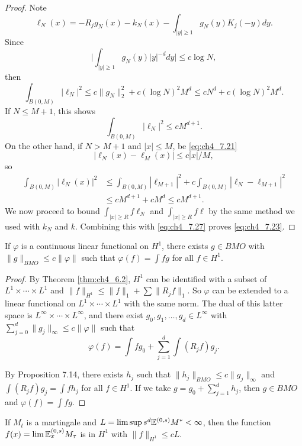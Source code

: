 \begin{proof}
Note
\[
    \ell_N(x) = -R_jg_N(x) - k_N(x) - \int_{|y|\geq 1} g_N(y)K_j(-y)dy.
\]
Since
\[
    \Big|\int_{|y|\geq 1} g_N(y)|y|^{-d}dy\Big| \leq c\log N,
\]
then
\[
    \int_{B(0,M)} |\ell_N|^2 \leq c\|g_N\|_2^2 + c(\log N)^2M^d \leq cN^d + c(\log N)^2M^d.
\]
If $N\le M+1$, this shows
\[
    \int_{B(0,M)}|\ell_N|^2\leq cM^{d+1}.
\]
On the other hand, if $N>M+1$ and $|x|\le M$, be \eqref{eq:ch4_7.21}
\[
    |\ell_N(x)-\ell_M(x)|\le c|x|/M,
\]
so
\begin{align*}
    \int_{B(0,M)}|\ell_N(x)|^2 &\leq \int_{B(0,M)}|\ell_{M+1}|^2 + c\int_{B(0,M)}|\ell_N-\ell_{M+1}|^2 \\
    &\leq cM^{d+1}+cM^d\le cM^{d+1}.
\end{align*}
We now proceed to bound $\int_{|x|\geq R} f\ell_N$ and $\int_{|x|\geq R} f\ell$ by the same method we used with $k_N$ and $k$. Combining this with \eqref{eq:ch4_7.27} proves \eqref{eq:ch4_7.23}.
\end{proof}

\begin{proposition}\label{prop:ch4_7.15}
If $\varphi$ is a continuous linear functional on $H^1$, there exists $g \in BMO$ with $\|g\|_{BMO} \leq c\|\varphi\|$ such that $\varphi(f) = \int fg$ for all $f \in H^1$.
\end{proposition}


\begin{proof}
By Theorem \ref{thm:ch4_6.2}, $H^1$ can be identified with a subset of $L^1 \times \cdots \times L^1$ and $\|f\|_{H^1} \leq \|f\|_1 + \sum \|R_jf\|_1$. So $\varphi$ can be extended to a linear functional on $L^1 \times \cdots \times L^1$ with the same norm. The dual of this latter space is $L^\infty \times \cdots \times L^\infty$, and there exist $g_0,g_1,\ldots,g_d \in L^\infty$ with $\sum_{j=0}^d \|g_j\|_\infty \leq c\|\varphi\|$ such that
\[
    \varphi(f) = \int fg_0 + \sum_{j=1}^d \int (R_jf)g_j.
\]

By Proposition 7.14, there exists $h_j$ such that $\|h_j\|_{BMO} \leq c\|g_j\|_\infty$ and $\int (R_jf)g_j = \int fh_j$ for all $f \in H^1$. If we take $g = g_0 + \sum_{j=1}^d h_j$, then $g \in BMO$ and $\varphi(f) = \int fg$.
\end{proof}

\begin{lemma}\label{lem:ch4_7.16}
If $M_t$ is a martingale and $L = \limsup s^d\mathbb{E}^{(0,s)}M^* < \infty$, then the function $f(x) = \lim\mathbb{E}_x^{(0,s)}M_\tau$ is in $H^1$ with $\|f\|_{H^1} \leq cL$.
\end{lemma}


